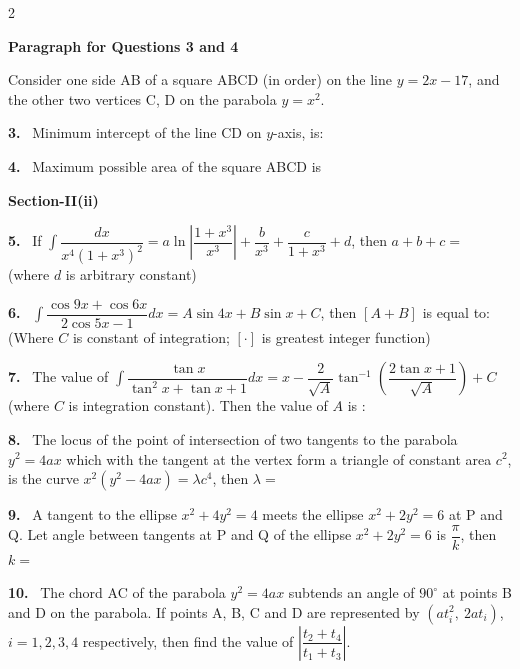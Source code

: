 \documentclass[10pt]{extarticle}
\newcommand{\sect}[1]{\par\smallskip\noindent\textbf{#1}\par}
\newcommand{\qn}[1]{\par\smallskip\noindent\textbf{#1.}~}
\newcommand{\paraq}[2]{\par\smallskip\noindent\textbf{Paragraph for Questions #1 and #2}\par}
\begin{document}
\begin{multicols}{2}
\paraq{3}{4}
Consider one side AB of a square ABCD (in order) on the line $y=2x-17$, and the other two vertices C, D on the parabola $y=x^2$.
\qn{3} Minimum intercept of the line CD on $y$-axis, is:
\qn{4} Maximum possible area of the square ABCD is
\sect{Section-II(ii)}
\qn{5} If $\displaystyle\int\dfrac{dx}{x^4\left(1+x^3\right)^2}=a\ln\left|\dfrac{1+x^3}{x^3}\right|+\dfrac b{x^3}+\dfrac c{1+x^3}+d$, then $a+b+c=$\\
(where $d$ is arbitrary constant)
\qn{6} $\displaystyle\int\dfrac{\cos9x+\cos6x}{2\cos5x-1}dx=A\sin4x+B\sin x+C$, then $[A+B]$ is equal to:\\
(Where $C$ is constant of integration; $[\cdot]$ is greatest integer function)
\qn{7} The value of $\displaystyle\int\dfrac{\tan x}{\tan^2x+\tan x+1}dx=x-\dfrac2{\sqrt A}\tan^{-1}\left(\dfrac{2\tan x+1}{\sqrt A}\right)+C$ (where $C$ is integration constant). Then the value of $A$ is :
\qn{8} The locus of the point of intersection of two tangents to the parabola $y^2=4ax$ which with the tangent at the vertex form a triangle of constant area $c^2$, is the curve $x^2\left(y^2-4ax\right)=\lambda c^4$, then $\lambda=$
\qn{9} A tangent to the ellipse $x^2+4y^2=4$ meets the ellipse $x^2+2y^2=6$ at P and Q. Let angle between tangents at P and Q of the ellipse $x^2+2y^2=6$ is $\dfrac\pi k$, then $k=$
\qn{10} The chord AC of the parabola $y^2=4ax$ subtends an angle of $90^\circ$ at points B and D on the parabola. If points A, B, C and D are represented by $\left(at_i^2,\ 2at_i\right)$, $i=1,2,3,4$ respectively, then find the value of $\left|\dfrac{t_2+t_4}{t_1+t_3}\right|$.
\end{multicols}
\end{document}
